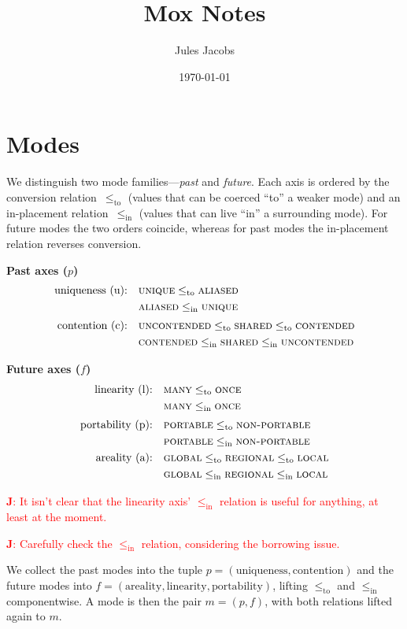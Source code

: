 \documentclass{article}
\title{Mox Notes}
\author{Jules Jacobs}
\date{\today}
\newcommand{\leqto}{\mathrel{\leq_{\mathrm{to}}}}
\newcommand{\leqin}{\mathrel{\leq_{\mathrm{in}}}}
\newcommand{\mode}[1]{\textsc{#1}}
\newcommand{\jules}[1]{{\textcolor{red}{\textbf{J}: #1}}}
\begin{document}
\maketitle

\section{Modes}

We distinguish two mode families—\emph{past} and \emph{future}.
Each axis is ordered by the conversion relation~$\leqto$ (values that can be coerced ``to'' a weaker mode) and an in-placement relation~$\leqin$ (values that can live ``in'' a surrounding mode).
For future modes the two orders coincide, whereas for past modes the in-placement relation reverses conversion.

\medskip
\noindent\textbf{Past axes ($p$)}
\[
\begin{alignedat}{2}
\text{uniqueness (u):}&\quad \mode{unique} \leqto \mode{aliased}\\
&\quad \mode{aliased} \leqin \mode{unique}\\[0.5ex]
\text{contention (c):}&\quad \mode{uncontended} \leqto \mode{shared} \leqto \mode{contended}\\
&\quad \mode{contended} \leqin \mode{shared} \leqin \mode{uncontended}
\end{alignedat}
\]

\medskip
\noindent\textbf{Future axes ($f$)}
\[
\begin{alignedat}{2}
\text{linearity (l):}&\quad \mode{many} \leqto \mode{once} \\
&\quad \mode{many} \leqin \mode{once}\\[0.5ex]
\text{portability (p):}&\quad \mode{portable} \leqto \mode{non-portable}\\
&\quad \mode{portable} \leqin \mode{non-portable}\\
\text{areality (a):}&\quad \mode{global} \leqto \mode{regional} \leqto \mode{local}\\
&\quad \mode{global} \leqin \mode{regional} \leqin \mode{local}
\end{alignedat}
\]

\jules{It isn't clear that the linearity axis' $\leqin$ relation is useful for anything, at least at the moment.}

\jules{Carefully check the $\leqin$ relation, considering the borrowing issue.}

\medskip                               
We collect the past modes into the tuple $p = (\text{uniqueness}, \text{contention})$ and the future modes into $f = (\text{areality}, \text{linearity}, \text{portability})$, lifting $\leqto$ and $\leqin$ componentwise.
A mode is then the pair $m = (p, f)$, with both relations lifted again to $m$.
\end{document}
